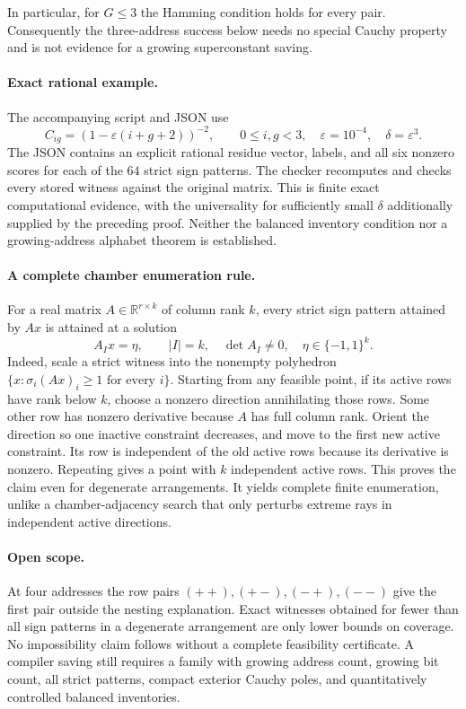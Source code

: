 In particular, for $G\leq3$ the Hamming condition holds for every pair.
Consequently the three-address success below needs no special Cauchy
 property and is not evidence for a growing superconstant saving.

\paragraph{Exact rational example.}
The accompanying script and JSON use
\[
 C_{ig}=\left(1-\varepsilon(i+g+2)\right)^{-2},
 \qquad 0\leq i,g<3,\quad
 \varepsilon=10^{-4},\quad\delta=\varepsilon^3.
\]
The JSON contains an explicit rational residue vector, labels, and all
 six nonzero scores for each of the $64$ strict sign patterns.  The checker
 recomputes and checks every stored witness against the original matrix.
This is finite exact computational evidence, with the universality for
 sufficiently small $\delta$ additionally supplied by the preceding proof.
Neither the balanced inventory condition nor a growing-address alphabet
 theorem is established.

\paragraph{A complete chamber enumeration rule.}
For a real matrix $A\in\mathbb R^{r\times k}$ of column rank $k$, every
 strict sign pattern attained by $Ax$ is attained at a solution
\[
 A_Ix=\eta,\qquad |I|=k,\quad\det A_I\ne0,
 \quad\eta\in\{-1,1\}^k.
\]
Indeed, scale a strict witness into the nonempty polyhedron
 $\{x:\sigma_i(Ax)_i\geq1\text{ for every }i\}$.
Starting from any feasible point, if its active rows have rank below $k$,
 choose a nonzero direction annihilating those rows.  Some other row has
 nonzero derivative because $A$ has full column rank.  Orient the direction
 so one inactive constraint decreases, and move to the first new active
 constraint.  Its row is independent of the old active rows because its
 derivative is nonzero.  Repeating gives a point with $k$ independent active
 rows.  This proves the claim even for degenerate arrangements.
It yields complete finite enumeration, unlike a chamber-adjacency search
 that only perturbs extreme rays in independent active directions.

\paragraph{Open scope.}
At four addresses the row pairs $(++),(+-),(-+),(--)$ give the first pair
 outside the nesting explanation.  Exact witnesses obtained for fewer than
 all sign patterns in a degenerate arrangement are only lower bounds on
 coverage.  No impossibility claim follows without a complete feasibility
 certificate.  A compiler saving still requires a family with growing
 address count, growing bit count, all strict patterns, compact exterior
 Cauchy poles, and quantitatively controlled balanced inventories.

